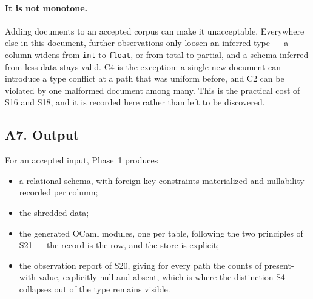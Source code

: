 \paragraph{It is not monotone.}
Adding documents to an accepted corpus can make it unacceptable. Everywhere
else in this document, further observations only loosen an inferred type ---
a column widens from \texttt{int} to \texttt{float}, or from total to partial,
and a schema inferred from less data stays valid. C4 is the exception: a
single new document can introduce a type conflict at a path that was uniform
before, and C2 can be violated by one malformed document among many. This is
the practical cost of S16 and S18, and it is recorded here rather than left to
be discovered.

\subsection*{A7. Output}

For an accepted input, Phase~1 produces

\begin{itemize}
  \item a relational schema, with foreign-key constraints materialized and
        nullability recorded per column;
  \item the shredded data;
  \item the generated OCaml modules, one per table, following the two
        principles of S21 --- the record is the row, and the store is
        explicit;
  \item the observation report of S20, giving for every path the counts of
        present-with-value, explicitly-null and absent, which is where the
        distinction S4 collapses out of the type remains visible.
\end{itemize}
